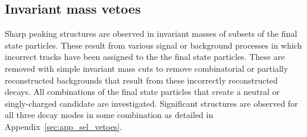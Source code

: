\subsection{Invariant mass vetoes}
\label{sec:kinematicvetos}

Sharp peaking structures are observed in invariant masses of subsets of the final state particles. These result from various signal or background processes in which incorrect tracks have been assigned to the the final state particles.   
These are removed with simple invariant mass cuts to remove combinatorial or partially reconstructed backgrounds that result from these incorrectly reconstructed decays. 
All combinations of the final state particles that create a neutral or singly-charged candidate are investigated.
Significant structures are observed for all three \Dsp decay modes in some combination as detailed in Appendix~\ref{sec:app_sel_vetoes}.







